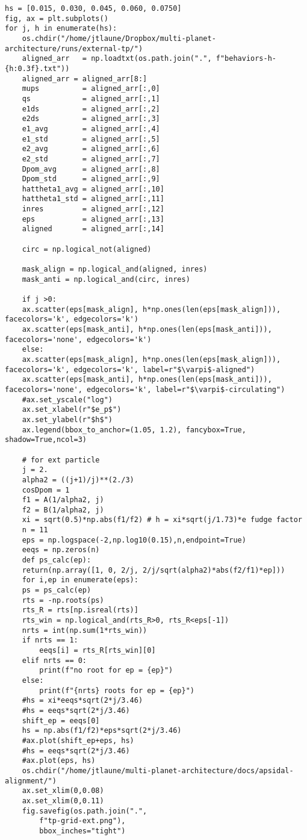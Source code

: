\documentclass[11pt]{article}
\begin{document}
\begin{verbatim}
hs = [0.015, 0.030, 0.045, 0.060, 0.0750]
fig, ax = plt.subplots()
for j, h in enumerate(hs):
    os.chdir("/home/jtlaune/Dropbox/multi-planet-architecture/runs/external-tp/")
    aligned_arr   = np.loadtxt(os.path.join(".", f"behaviors-h-{h:0.3f}.txt"))
    aligned_arr = aligned_arr[8:]
    mups          = aligned_arr[:,0]
    qs            = aligned_arr[:,1]
    e1ds          = aligned_arr[:,2]
    e2ds          = aligned_arr[:,3]
    e1_avg        = aligned_arr[:,4]
    e1_std        = aligned_arr[:,5]  
    e2_avg        = aligned_arr[:,6]
    e2_std        = aligned_arr[:,7]
    Dpom_avg      = aligned_arr[:,8]
    Dpom_std      = aligned_arr[:,9]
    hattheta1_avg = aligned_arr[:,10]
    hattheta1_std = aligned_arr[:,11]
    inres         = aligned_arr[:,12]
    eps           = aligned_arr[:,13]
    aligned       = aligned_arr[:,14]

    circ = np.logical_not(aligned)

    mask_align = np.logical_and(aligned, inres)
    mask_anti = np.logical_and(circ, inres)

    if j >0:
	ax.scatter(eps[mask_align], h*np.ones(len(eps[mask_align])), facecolors='k', edgecolors='k')
	ax.scatter(eps[mask_anti], h*np.ones(len(eps[mask_anti])), facecolors='none', edgecolors='k')
    else:
	ax.scatter(eps[mask_align], h*np.ones(len(eps[mask_align])), facecolors='k', edgecolors='k', label=r"$\varpi$-aligned")
	ax.scatter(eps[mask_anti], h*np.ones(len(eps[mask_anti])), facecolors='none', edgecolors='k', label=r"$\varpi$-circulating")
    #ax.set_yscale("log")
    ax.set_xlabel(r"$e_p$")
    ax.set_ylabel(r"$h$")
    ax.legend(bbox_to_anchor=(1.05, 1.2), fancybox=True, shadow=True,ncol=3)

    # for ext particle
    j = 2. 
    alpha2 = ((j+1)/j)**(2./3)
    cosDpom = 1
    f1 = A(1/alpha2, j)
    f2 = B(1/alpha2, j)
    xi = sqrt(0.5)*np.abs(f1/f2) # h = xi*sqrt(j/1.73)*e fudge factor
    n = 11
    eps = np.logspace(-2,np.log10(0.15),n,endpoint=True)
    eeqs = np.zeros(n)
    def ps_calc(ep):
	return(np.array([1, 0, 2/j, 2/j/sqrt(alpha2)*abs(f2/f1)*ep]))
    for i,ep in enumerate(eps):
	ps = ps_calc(ep)
	rts = -np.roots(ps)
	rts_R = rts[np.isreal(rts)]
	rts_win = np.logical_and(rts_R>0, rts_R<eps[-1])
	nrts = int(np.sum(1*rts_win))
	if nrts == 1:
	    eeqs[i] = rts_R[rts_win][0]
	elif nrts == 0:
	    print(f"no root for ep = {ep}")
	else:
	    print(f"{nrts} roots for ep = {ep}")
    #hs = xi*eeqs*sqrt(2*j/3.46)
    #hs = eeqs*sqrt(2*j/3.46)
    shift_ep = eeqs[0]
    hs = np.abs(f1/f2)*eps*sqrt(2*j/3.46)
    #ax.plot(shift_ep+eps, hs)
    #hs = eeqs*sqrt(2*j/3.46)
    #ax.plot(eps, hs)
    os.chdir("/home/jtlaune/multi-planet-architecture/docs/apsidal-alignment/")
    ax.set_xlim(0,0.08)
    ax.set_xlim(0,0.11)
    fig.savefig(os.path.join(".",
		f"tp-grid-ext.png"),
		bbox_inches="tight")
\end{verbatim}
\end{document}
